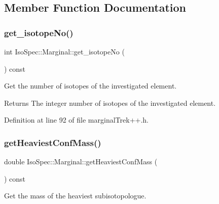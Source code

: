 \subsection{Member Function Documentation}
\mbox{\label{class_iso_spec_1_1_marginal_a05aa80c3fa77a0406102731934db1a83}} 
\subsubsection{\texorpdfstring{get\+\_\+isotope\+No()}{get\_isotopeNo()}}
{\footnotesize\ttfamily int Iso\+Spec\+::\+Marginal\+::get\+\_\+isotope\+No (\begin{DoxyParamCaption}{ }\end{DoxyParamCaption}) const\hspace{0.3cm}{\ttfamily [inline]}}



Get the number of isotopes of the investigated element. 

\begin{DoxyReturn}{Returns}
The integer number of isotopes of the investigated element. 
\end{DoxyReturn}


Definition at line 92 of file marginal\+Trek++.\+h.

\mbox{\label{class_iso_spec_1_1_marginal_aa5598b4d2b31b5daec1c2bac653d0aff}} 
\subsubsection{\texorpdfstring{get\+Heaviest\+Conf\+Mass()}{getHeaviestConfMass()}}
{\footnotesize\ttfamily double Iso\+Spec\+::\+Marginal\+::get\+Heaviest\+Conf\+Mass (\begin{DoxyParamCaption}{ }\end{DoxyParamCaption}) const}



Get the mass of the heaviest subisotopologue. 

